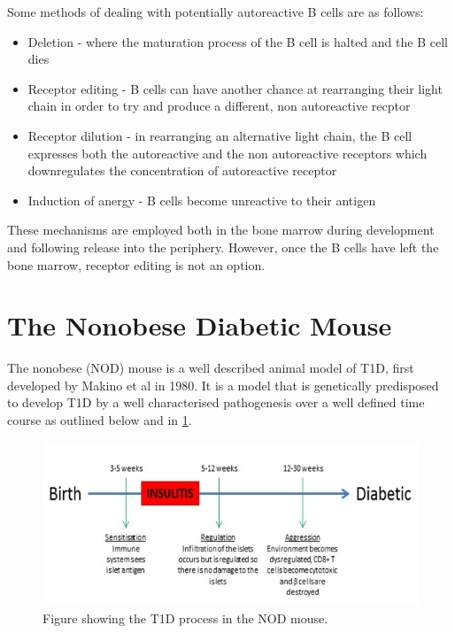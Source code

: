 Some methods of dealing with potentially autoreactive B cells are as follows:
\begin{itemize}
\item Deletion - where the maturation process of the B cell is halted and the B cell dies \citep{Cornall1995}
\item Receptor editing - B cells can have another chance at rearranging their light chain in order to try and produce a different, non autoreactive recptor \citep{Orduno2009, Gay1993}
\item Receptor dilution - in rearranging an alternative light chain, the B cell expresses both the autoreactive and the non autoreactive receptors which downregulates the concentration of autoreactive receptor \citep{Gay1993, Orduno2009}
\item Induction of anergy - B cells become unreactive to their antigen \citep{Orduno2009}
\end{itemize}

These mechanisms are employed both in the bone marrow during development and following release into the periphery.
However, once the B cells have left the bone marrow, receptor editing is not an option.



\section{The Nonobese Diabetic Mouse}

The nonobese (NOD) mouse is a well described animal model of T1D, first developed by Makino et al  in 1980.
It is a model that is genetically predisposed to develop T1D by a well characterised pathogenesis over a well defined time course as outlined below and in \cref{fig:diseasecourse}.

\begin{figure}
\includegraphics[width=\textwidth]{Figures/Diseasecourse.png}
\caption{Figure showing the T1D process in the NOD mouse.}
\label{fig:diseasecourse}
\end{figure}

